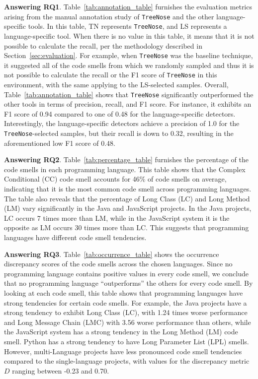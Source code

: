 


{\bf Answering RQ1}. Table~\ref{tab:annotation_table} furnishes the evaluation
metrics arising from the manual annotation study of \texttt{TreeNose} and the
other language-specific tools.
%
In this table, TN represents \texttt{TreeNose}, and LS represents a
language-specific tool.
%
When there is no value in this table, it means that it is not possible to
calculate the recall, per the methodology described in
Section~\ref{sec:evaluation}.
%
For example, when \texttt{TreeNose} was the baseline technique, it suggested
all of the code smells from which we randomly sampled and thus it is not
possible to calculate the recall or the F1 score of \texttt{TreeNose} in this
environment, with the same applying to the LS-selected samples.
%
Overall, Table~\ref{tab:annotation_table} shows that \texttt{TreeNose}
significantly outperformed the other tools in terms of precision, recall, and
F1 score.
%
For instance, it exhibits an F1 score of 0.94 compared to one of 0.48 for the
language-specific detectors.
%
Interestingly, the language-specific detectors achieve a precision of 1.0 for
the \texttt{TreeNose}-selected samples, but their recall is down to 0.32,
resulting in the aforementioned low F1 score of 0.48.


{\bf Answering RQ2}. Table~\ref{tab:percentage_table} furnishes the percentage
of the code smells in each programming language. This table shows that the
Complex Conditional (CC) code smell accounts for 46\% of code smells on
average, indicating that it is the most common code smell across programming
languages.
%
The table also reveals that the percentage of Long Class (LC) and Long Method
(LM) vary significantly in the Java and JavaScript projects. In the Java
projects, LC occurs 7 times more than LM, while in the JavaScript system it is
the opposite as LM occurs 30 times more than LC. This suggests that programming
languages have different code smell tendencies.

{\bf Answering RQ3}. Table~\ref{tab:occurrence_table} shows the occurrence
discrepancy scores of the code smells across the chosen languages. Since no
programming language contains positive values in every code smell, we conclude
that no programming language ``outperforms'' the others for every code smell.
By looking at each code smell, this table shows that programming languages have
strong tendencies for certain code smells.
%
For example, the Java projects have a strong tendency to exhibit Long Class
(LC), with 1.24 times worse performance and Long Message Chain (LMC) with 3.56
worse performance than others, while the JavaScript system has a strong
tendency in the Long Method (LM) code smell. Python has a strong tendency to
have Long Parameter List (LPL) smells. However, multi-Language projects have
less pronounced code smell tendencies compared to the single-language projects,
with values for the discrepancy metric $D$ ranging between -0.23 and 0.70.
